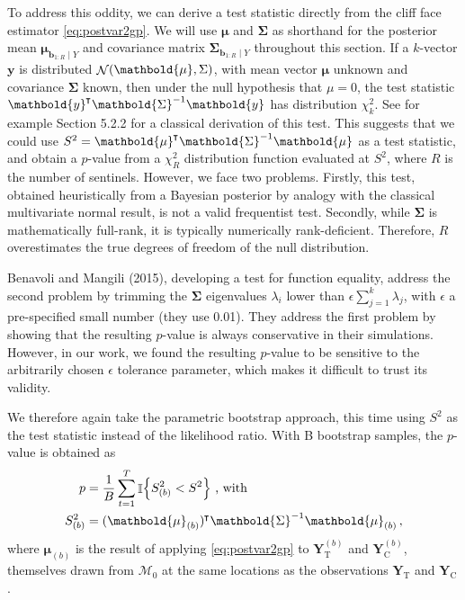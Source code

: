 \documentclass[letter,12pt]{article}
\DeclarePairedDelimiter{\parenthesis}{\lparen}{\rparen}
\DeclarePairedDelimiter{\curlybracket}{\lbrace}{\rbrace}
\newcommand{\del}[1]{\parenthesis*{#1}}
\newcommand{\cbr}[1]{\curlybracket*{#1}}
\DeclareMathOperator{\Ind}{\mathbb{I}}
\DeclareMathOperator{\normal}{\mathcal{N}}
\newcommand*{\trans}{^{\mkern-1.5mu\intercal}}
\newcommand{\treat}{\mathrm{T}}
\newcommand{\ctrol}{\mathrm{C}}
\newcommand{\yvec}{\mathbold{y}}
\newcommand{\Yvec}{\mathbold{Y}}
\newcommand{\yt}{\Yvec_{\treat}}
\newcommand{\yc}{\Yvec_{\ctrol}}
\newcommand{\muvec}{\mathbold{\mu}}
\newcommand{\sentinel}{\bm{b}}
\newcommand{\numsent}{R}
\newcommand{\sentinels}{\sentinel_{1:\numsent}}
\newcommand{\modnull}{\mathscr{M}_0}
\newcommand{\SigmaMat}{\mathbold{\Sigma}}
\begin{document}
To address this oddity, we can derive a test statistic directly from the cliff face estimator \eqref{eq:postvar2gp}.
We will use \(\muvec\) and \(\SigmaMat\) as shorthand for the posterior mean \(\muvec_{\sentinels \mid Y}\)
and covariance matrix \(\SigmaMat_{\sentinels \mid Y}\) throughout this section.
If a \(k\)-vector \(\yvec\) is distributed \(\normal\del{\muvec, \Sigma}\), with mean vector \(\muvec\) unknown and covariance \(\SigmaMat\) known, then under the null hypothesis that \(\mu=0\), the test statistic \(\yvec\trans \SigmaMat^{-1} \yvec\) has distribution \(\chi^2_k\).
See for example \cite{rencher2003methods} Section 5.2.2 for a classical derivation of this test.
This suggests that we could use \(S^2=\muvec\trans \SigmaMat^{-1} \muvec\) as a test statistic,
and obtain a \(p\)-value from a \(\chi^2_\numsent\) distribution function evaluated at \(S^2\), where \(\numsent\) is the number of sentinels.
However, we face two problems.
Firstly, this test, obtained heuristically from a Bayesian posterior by analogy with the classical multivariate normal result, is not a valid frequentist test.
Secondly, while \(\SigmaMat\) is mathematically full-rank, it is typically numerically rank-deficient.
Therefore, \(\numsent\) overestimates the true degrees of freedom of the null distribution.

Benavoli and Mangili (2015), developing a test for function equality, address the second problem by trimming the \(\SigmaMat\) eigenvalues \(\lambda_i\) lower than \(\epsilon \sum_{j=1}^k \lambda_j\), with \(\epsilon\) a pre-specified small number (they use 0.01).
They address the first problem by showing that the resulting \(p\)-value is always conservative in their simulations.
However, in our work, we found the resulting \(p\)-value to be sensitive to the arbitrarily chosen \(\epsilon\) tolerance parameter, which makes it difficult to trust its validity.

We therefore again take the parametric bootstrap approach, this time using \(S^2\) as the test statistic instead of the likelihood ratio.
With B bootstrap samples, the \(p\)-value is obtained as
\begin{equation}
    \begin{split}
        p &= \frac{1}{B} \sum_{t=1}^T \Ind\cbr{S_{(b)}^2 < S^2}\  \text{, with}\\
        S_{(b)}^2 &= (\muvec_{(b)} )\trans \SigmaMat^{-1} \muvec_{(b)}\,,
    \end{split}
\end{equation}
where \(\muvec_{(b)}\) is the result of applying \eqref{eq:postvar2gp} to \(\yt^{(b)}\) and \(\yc^{(b)}\), themselves drawn from \(\modnull\) at the same locations as the observations \(\yt\) and \(\yc\).
\end{document}
